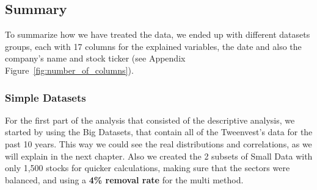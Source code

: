 \documentclass[11pt,english,a4paper,hidelinks]{book}
\begin{document}



\subsection{Summary}

\noindent To summarize how we have treated the data, we ended up with different datasets groups, each with 17 columns for the explained variables, the date and also the company's name and stock ticker (see Appendix Figure~\ref{fig:number_of_columns}).

\subsubsection{Simple Datasets}
\noindent For the first part of the analysis that consisted of the descriptive analysis, we started by using the Big Datasets, that contain all of the Tweenvest's data for the past 10 years. This way we could see the real distributions and correlations, as we will explain in the next chapter. Also we created the 2 subsets of Small Data with only 1,500 stocks for quicker calculations, making sure that the sectors were balanced, and using a \textbf{4\% removal rate} for the \acrshort{multi} method.
\end{document}
